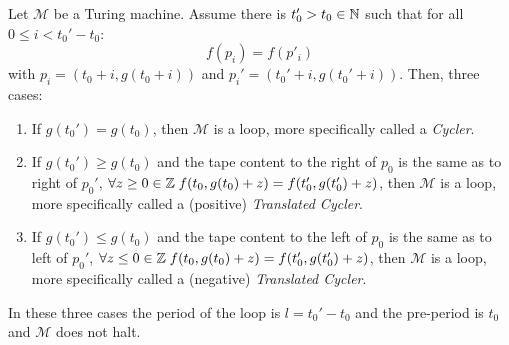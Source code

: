 \begin{theorem} Let $\mathcal{M}$ be a Turing machine.
    Assume there is $t_0' > t_0 \in \mathbb{N}$ such that
    for all $0 \leq i < t_0'-t_0$: $$f(p_i) = f(p'_i)$$ with $p_i = (t_0+i, g(t_0+i))$ and $p_i' = (t_0'+i, g(t_0'+i))$. Then, three cases:
    \begin{enumerate}
        \item If $g(t_0') = g(t_0)$, then $\mathcal{M}$ is a loop, more specifically called a \textit{Cycler}.\label{th:case1}
        \item If $g(t_0') \geq g(t_0)$ and the tape content to the right of $p_0$ is the same as to right of $p_0'$, \ie $\forall z \geq 0 \in  \mathbb{Z} \; f(t_0,g(t_0)+z) = f(t_0',g(t_0')+z)$, then $\mathcal{M}$ is a loop, more specifically called a (positive) \textit{Translated Cycler}.\label{th:case2}
        \item If $g(t_0') \leq g(t_0)$ and the tape content to the left of $p_0$ is the same as to left of $p_0'$, \ie $\forall z \leq 0 \in \mathbb{Z} \; f(t_0,g(t_0)+z) = f(t_0',g(t_0')+z)$, then $\mathcal{M}$ is a loop, more specifically called a (negative) \textit{Translated Cycler}.\label{th:case3}
    \end{enumerate}
    In these three cases the period of the loop is $l = t_0' - t_0$ and the pre-period is $t_0$ and $\mathcal{M}$ does not halt.
\end{theorem}

